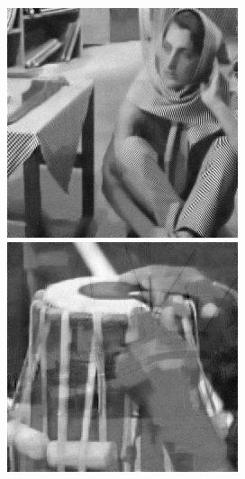 \begin{figure}[!htbp]
{\begin{minipage}[b]{0.23\linewidth}
\includegraphics[width=1\linewidth]{images/ammca_out3.png}\vspace{4pt}
\includegraphics[width=1\linewidth]{images/ammca_out1.png}
\end{minipage}}

\end{figure}
